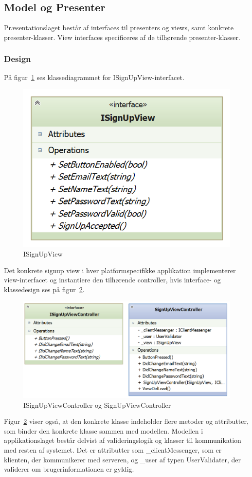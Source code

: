 \subsection{Model og Presenter}
Præsentationslaget består af interfaces til presenters og views, samt konkrete presenter-klasser. View interfaces specificeres af de tilhørende presenter-klasser.

\subsubsection{Design}
På figur~\ref{fig:application_isignupview} ses klassediagrammet for ISignUpView-interfacet.

\begin{figure}
\centering
\includegraphics[width=0.4\linewidth]{figs/design/application_isignupview}
\caption{ISignUpView}
\label{fig:application_isignupview}
\end{figure}

Det konkrete signup view i hver platformspecifikke applikation implementerer view-interfacet og instantiere den tilhørende controller, hvis interface- og klassedesign ses på figur~\ref{fig:application_isignupviewcontroller}.

\begin{figure}
\centering
\includegraphics[width=0.7\linewidth]{figs/design/application_signupviewcontrollerandinterface}
\caption{ISignUpViewController og SignUpViewController}
\label{fig:application_isignupviewcontroller}
\end{figure}

Figur~\ref{fig:application_isignupviewcontroller} viser også, at den konkrete klasse indeholder flere metoder og attributter, som binder den konkrete klasse sammen med modellen. Modellen i applikationslaget består delvist af valideringslogik og klasser til kommunikation med resten af systemet. Det er attributter som \_clientMessenger, som er klienten, der kommunikerer med serveren, og \_user af typen UserValidater, der validerer om brugerinformationen er gyldig.

